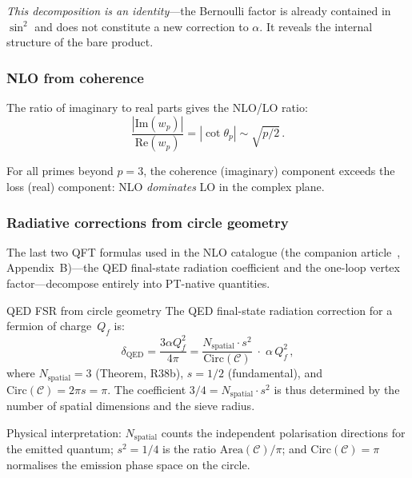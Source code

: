 \documentclass[12pt,a4paper]{article}
\begin{document}
\emph{This decomposition is an identity}---the Bernoulli factor is already
contained in $\sin^2$ and does not constitute a new correction to
$\alpha$. It reveals the internal structure of the bare product.

\subsubsection{NLO from coherence}

The ratio of imaginary to real parts gives the NLO/LO ratio:
\begin{equation}
  \frac{|\mathrm{Im}(w_p)|}{\mathrm{Re}(w_p)}
  = |\cot\theta_p|
  \sim \sqrt{p/2}\,.
  \label{eq:nlo_cot}
\end{equation}

For all primes beyond $p = 3$, the coherence (imaginary) component
exceeds the loss (real) component: NLO \emph{dominates} LO in the
complex plane.


\subsubsection{Radiative corrections from circle geometry}
\label{subsec:cx_radiative}

The last two QFT formulas used in the NLO catalogue
(the companion article~\cite{companion_physics}, Appendix~B)---the QED final-state radiation
coefficient and the one-loop vertex factor---decompose entirely
into PT-native quantities.

\begin{derbox}{QED FSR from circle geometry}
\label{der:fsr_circle}
The QED final-state radiation correction for a fermion of charge~$Q_f$
is:
\begin{equation}
  \delta_{\mathrm{QED}} = \frac{3\alpha Q_f^2}{4\pi}
  = \frac{N_{\mathrm{spatial}}\cdot s^2}{\mathrm{Circ}(\mathcal{C})}
  \;\cdot\;\alpha\,Q_f^2\,,
  \label{eq:fsr_pt}
\end{equation}
where $N_{\mathrm{spatial}} = 3$ (Theorem, R38b),
$s = 1/2$ (fundamental), and
$\mathrm{Circ}(\mathcal{C}) = 2\pi s = \pi$.
The coefficient $3/4 = N_{\mathrm{spatial}}\cdot s^2$ is thus
determined by the number of spatial dimensions and the sieve radius.
\end{derbox}

Physical interpretation: $N_{\mathrm{spatial}}$ counts the independent
polarisation directions for the emitted quantum;
$s^2 = 1/4$ is the ratio $\mathrm{Area}(\mathcal{C})/\pi$;
and $\mathrm{Circ}(\mathcal{C}) = \pi$ normalises the emission
phase space on the circle.
\end{document}
